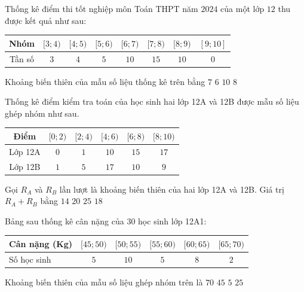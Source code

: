 \begin{ex}%
	Thống kê điểm thi tốt nghiệp môn Toán THPT năm $2024$ của một lớp $12$ thu được kết quả như sau:
	\begin{center}
		\begin{tabular}{|c|c|c|c|c|c|c|c|}
			\hline
			Nhóm & $[3;4)$ & $[4;5)$ & $[5;6)$ & $[6;7)$ & $[7;8)$ & $[8;9)$ & $[9;10]$ \\
			\hline
			Tần số & $3$ & $4$ & $5$ & $10$ & $15$ & $10$ & $0$ \\
			\hline
		\end{tabular}
	\end{center}
	Khoảng biến thiên của mẫu số liệu thống kê trên bằng
	\choice
	{$7$}
	{\True $6$}
	{$10$}
	{$8$}
\end{ex}

\begin{ex}%
Thống kê điểm kiểm tra toán của học sinh hai lớp 12A và 12B được mẫu số liệu ghép nhóm như sau.
\begin{center}
\begin{tabular}{|c|c|c|c|c|c|}
\hline
Điểm & $[0;2)$ & $[2;4)$ & $[4;6)$ & $[6;8)$ & $[8;10)$ \\
\hline
Lớp 12A & $0$ & $1$ & $10$ & $15$ & $17$ \\
\hline
Lớp 12B & $1$ & $5$ & $17$ & $10$ & $9$ \\
\hline
\end{tabular}
\end{center}
Gọi $R_A$ và $R_B$ lần lượt là khoảng biến thiên của hai lớp 12A và 12B. Giá trị $R_A+R_B$ bằng
\choice
{$14$}
{$20$}
{$25$}
{\True $18$}
\end{ex}

\begin{ex}%
	Bảng sau thống kê cân nặng của 30 học sinh lớp 12A1:
	\begin{center}
		\begin{tabular}{|l|c|c|c|c|c|}
			\hline
			Cân nặng (Kg) & $[45;50)$ & $[50;55)$ & $[55;60)$ & $[60;65)$ & $[65;70)$ \\ \hline
			Số học sinh & $5$ & $10$ & $5$ & $8$ & $2$ \\ \hline
		\end{tabular}
	\end{center}
	Khoảng biến thiên của mẫu số liệu ghép nhóm trên là
	\choice
	{$70$}
	{$45$}
	{$5$}
	{\True $25$}
\end{ex}

